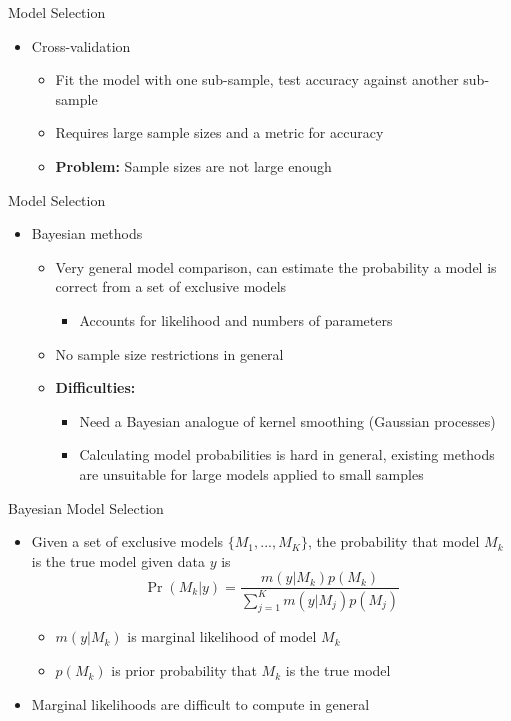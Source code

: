 \documentclass{beamer}
\begin{document}
\begin{frame}{Model Selection}
\begin{itemize}
	\item Cross-validation
	\begin{itemize}
		\item Fit the model with one sub-sample, test accuracy against another sub-sample
		\item Requires large sample sizes and a metric for accuracy
		\item \textbf{Problem:} Sample sizes are not large enough
	\end{itemize}
\end{itemize}
\end{frame}

\begin{frame}{Model Selection}
\begin{itemize}
	\item Bayesian methods
		\begin{itemize}
			\item Very general model comparison, can estimate the probability a model is correct from a set of exclusive models
				\begin{itemize}
					\item Accounts for likelihood and numbers of parameters
				\end{itemize}
			\item No sample size restrictions in general
			\item \textbf{Difficulties:}
				\begin{itemize}
					\item Need a Bayesian analogue of kernel smoothing (Gaussian processes)
					\item Calculating model probabilities is hard in general, existing methods are unsuitable for large models applied to small samples
				\end{itemize}
		\end{itemize}
\end{itemize}
\end{frame}

\begin{frame}{Bayesian Model Selection}
\begin{itemize}
	\item Given a set of exclusive models $\{M_1, ..., M_K\}$, the probability that model $M_k$ is the true model given data $y$ is $$\Pr(M_k|y) = \frac{m(y|M_k)p(M_k)}{\sum_{j=1}^K m(y|M_j)p(M_j)}$$
		\begin{itemize}
			\item $m(y|M_k)$ is marginal likelihood of model $M_k$
			\item $p(M_k)$ is prior probability that $M_k$ is the true model
		\end{itemize}
	\item Marginal likelihoods are difficult to compute in general
\end{itemize}
\end{frame}
\end{document}
